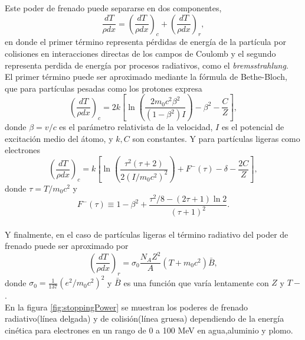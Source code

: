 Este poder de frenado puede separarse en dos componentes, 
\begin{equation}
	\frac{dT}{\rho dx}=\left(\frac{dT}{\rho dx}\right)_c+\left(\frac{dT}{\rho dx}\right)_r,
\end{equation}   
en donde el primer término representa pérdidas de energía de la partícula por colisiones en interacciones directas de los campos de Coulomb y el segundo representa perdida de energía por procesos radiativos, como el \textit{bremsstrahlung}.\\

El primer término puede ser aproximado mediante la fórmula de Bethe-Bloch, que para partículas pesadas como los protones expresa\cite{Attix1986}
\begin{equation}
	\left(\frac{d T}{\rho d x}\right)_{c}=2 k\left[\ln \left(\frac{2 m_{0} c^{2} \beta^{2}}{\left(1-\beta^{2}\right) I}\right)-\beta^{2} -\frac{C}{Z}\right],
\end{equation}
donde $\beta=v/c$ es el parámetro relativista de la velocidad, $I$ es el potencial de excitación medio del átomo, y $k,C$ son constantes. Y para partículas ligeras como electrones
\begin{equation}\left(\frac{d T}{\rho d x}\right)_{c}=k\left[\ln \left(\frac{\tau^{2}(\tau+2)}{2\left(I / m_{0} c^{2}\right)^{2}}\right)+F^{-}(\tau)-\delta-\frac{2 C}{Z}\right],\end{equation}
donde $\tau=T/m_0c^2$ y 
\begin{equation}F^{-}(\tau) \equiv 1-\beta^{2}+\frac{\tau^{2} / 8-(2 \tau+1) \ln 2}{(\tau+1)^{2}}.\end{equation}\\

Y finalmente, en el caso de partículas ligeras el término radiativo del poder de frenado puede ser aproximado por \cite{Attix1986}
\begin{equation}\left(\frac{d T}{\rho d x}\right)_{r}=\sigma_{0} \frac{N_{A} Z^{2}}{A}\left(T+m_{0} c^{2}\right) \bar{B},\end{equation}
donde $\sigma_0=\frac{1}{137}(e^2/m_0c^2)^2$ y $\bar{B}$ es una función que varía lentamente con $Z$ y $T-$.\\

En la figura \ref{fig:stoppingPower} se muestran los poderes de frenado radiativo(línea delgada) y de colisión(línea gruesa) dependiendo de la energía cinética para electrones en un rango de 0 a 100 MeV en agua,aluminio y plomo.\\

